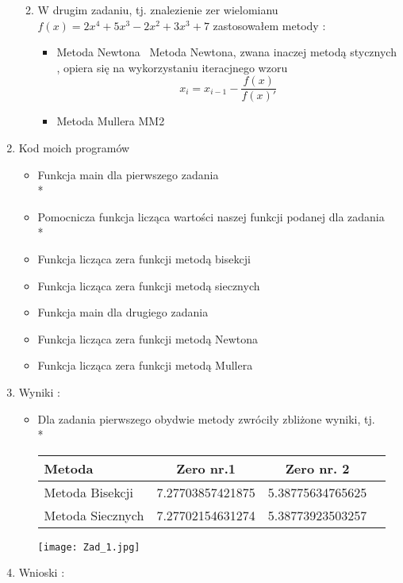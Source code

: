 \documentclass[a4paper, 11pt]{article}
\begin{document}
\begin{enumerate}
\begin{enumerate}
\begin{itemize}
\end{itemize}
\item W drugim zadaniu, tj. znalezienie zer wielomianu \( f(x) = 2x^4 + 5x^3 - 2x^2 +3x^3 +7 \) zastosowałem metody : 
\begin{itemize}
\item Metoda Newtona \, Metoda Newtona, zwana inaczej metodą stycznych , opiera się na wykorzystaniu iteracjnego wzoru \[ x_i = x_{i-1} - \dfrac{f(x)}{f(x)'} \]
\item Metoda Mullera MM2
\end{itemize}
\end{enumerate}

\item Kod moich programów 
\begin{itemize}
\item Funkcja main dla pierwszego zadania \\*

\item Pomocnicza funkcja licząca wartości naszej funkcji podanej dla zadania \\*
 
 \item Funkcja licząca zera funkcji metodą bisekcji
 
 \item Funkcja licząca zera funkcji metodą siecznych
 
  \item Funkcja main dla drugiego zadania
 
   \item Funkcja licząca zera funkcji metodą Newtona
 
   \item Funkcja licząca zera funkcji metodą Mullera
 
\end{itemize}
\item
Wyniki : 
\begin{itemize}
\item  Dla zadania pierwszego obydwie metody zwróciły zbliżone wyniki, tj.\\*
\begin{center}

	\begin{tabular}{ l*{2}{c}r}
  \hline	
	Metoda & Zero nr.1 & Zero nr. 2 \\ \hline
    Metoda Bisekcji & 7.27703857421875	& 5.38775634765625	\\
    Metoda Siecznych & 7.27702154631274	& 5.38773923503257 \\
  \hline
  \end{tabular}

\end{center}
\texttt{[image: Zad\_1.jpg]}
\end{itemize}
\item Wnioski : 
\end{enumerate}
\end{document}
